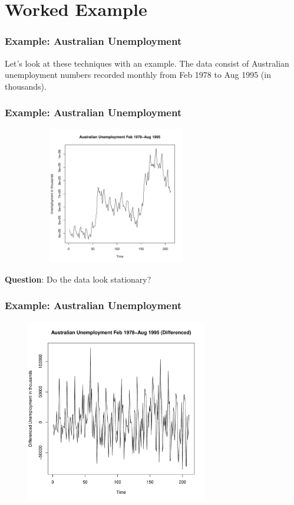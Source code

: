 \documentclass[%
xcolor=pdftex]{beamer}
\begin{document}
\section{Worked Example}
\frame{\tableofcontents[currentsection]}

\begin{frame}
\frametitle{Example: Australian Unemployment}

Let's look at these techniques with an example. The data consist of Australian unemployment numbers recorded monthly from Feb 1978 to Aug 1995 (in thousands).

\end{frame}

\begin{frame}
\frametitle{Example: Australian Unemployment}

\includegraphics[width=100mm, height=60mm]{pics/auemp.pdf}

\textbf{Question}: Do the data look stationary?

\end{frame}

\begin{frame}
\frametitle{Example: Australian Unemployment}

\includegraphics[width=100mm, height=80mm]{pics/dauemp.pdf}

\end{frame}
\end{document}
